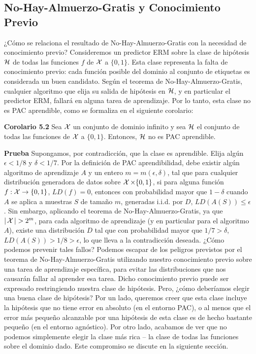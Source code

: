 \begin{teo}
\section*{No-Hay-Almuerzo-Gratis y Conocimiento Previo}
¿Cómo se relaciona el resultado de No-Hay-Almuerzo-Gratis con la necesidad de conocimiento previo? Consideremos un predictor ERM sobre la clase de hipótesis $\mathop{\mbox{$\mathcal{H}$}}\nolimits$ de todas las funciones $f$ de $\mathop{\mbox{$\mathcal{X}$}}\nolimits$ a $\{0, 1\}$. Esta clase representa la falta de conocimiento previo: cada función posible del dominio al conjunto de etiquetas es considerada un buen candidato. Según el teorema de No-Hay-Almuerzo-Gratis, cualquier algoritmo que elija su salida de hipótesis en $\mathop{\mbox{$\mathcal{H}$}}\nolimits$, y en particular el predictor ERM, fallará en alguna tarea de aprendizaje.
Por lo tanto, esta clase no es PAC aprendible, como se formaliza en el siguiente corolario:

\textbf{Corolario 5.2}
Sea $\mathop{\mbox{$\mathcal{X}$}}\nolimits$ un conjunto de dominio infinito y sea $\mathop{\mbox{$\mathcal{H}$}}\nolimits$ el conjunto de todas las funciones de $\mathop{\mbox{$\mathcal{X}$}}\nolimits$ a $\{0, 1\}$. Entonces, $\mathop{\mbox{$\mathcal{H}$}}\nolimits$ no es PAC aprendible.

\textbf{Prueba}
Supongamos, por contradicción, que la clase es aprendible. Elija algún $\epsilon < 1/8$ y $\delta < 1/7$. Por la definición de PAC aprendibilidad, debe existir algún algoritmo de aprendizaje $A$ y un entero $m = m(\epsilon, \delta)$, tal que para cualquier distribución generadora de datos sobre $\mathop{\mbox{$\mathcal{X}$}}\nolimits \times \{0, 1\}$, si para alguna función $f : \mathop{\mbox{$\mathcal{X}$}}\nolimits \rightarrow \{0, 1\}$, $LD(f) = 0$, entonces con probabilidad mayor que $1 - \delta$ cuando $A$ se aplica a muestras $S$ de tamaño $m$, generadas i.i.d. por $D$, $LD(A(S)) \leq \epsilon$. Sin embargo, aplicando el teorema de No-Hay-Almuerzo-Gratis, ya que $|\mathop{\mbox{$\mathcal{X}$}}\nolimits| > 2^m$, para cada algoritmo de aprendizaje (y en particular para el algoritmo $A$), existe una distribución $D$ tal que con probabilidad mayor que $1/7 > \delta$, $LD(A(S)) > 1/8 > \epsilon$, lo que lleva a la contradicción deseada.
¿Cómo podemos prevenir tales fallos? Podemos escapar de los peligros previstos por el teorema de No-Hay-Almuerzo-Gratis utilizando nuestro conocimiento previo sobre una tarea de aprendizaje específica, para evitar las distribuciones que nos causarán fallar al aprender esa tarea.
Dicho conocimiento previo puede ser expresado restringiendo nuestra clase de hipótesis.
Pero, ¿cómo deberíamos elegir una buena clase de hipótesis? Por un lado, queremos creer que esta clase incluye la hipótesis que no tiene error en absoluto (en el entorno PAC), o al menos que el error más pequeño alcanzable por una hipótesis de esta clase es de hecho bastante pequeño (en el entorno agnóstico). Por otro lado, acabamos de ver que no podemos simplemente elegir la clase más rica – la clase de todas las funciones sobre el dominio dado. Este compromiso se discute en la siguiente sección.


\end{teo}
